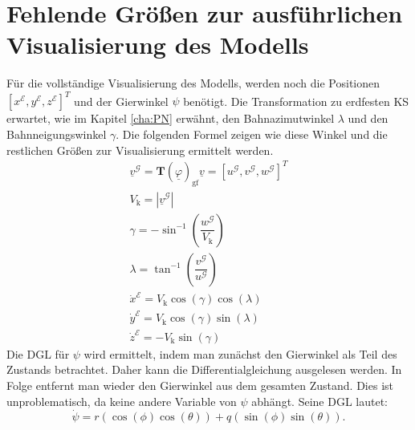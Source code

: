 \section{Fehlende Größen zur ausführlichen Visualisierung des Modells}
\label{sec:Visialisis}
Für die vollständige Visualisierung des Modells, werden noch die Positionen $[x^\mathcal{E},y^\mathcal{E},z^\mathcal{E}]^T$ und der Gierwinkel $\psi$ benötigt.  Die Transformation zu erdfesten KS erwartet, wie im Kapitel \ref{cha:PN} erwähnt, den Bahnazimutwinkel $\lambda$ und den Bahnneigungswinkel $\gamma$. Die folgenden Formel zeigen wie diese Winkel und die restlichen  Größen zur Visualisierung ermittelt werden.
\begin{align}
\underline{v}^\mathcal{G} = \textbf{T}(\underline{\varphi})_\mathrm{gf}\underline{v} = [u^\mathcal{G},v^\mathcal{G},w^\mathcal{G}]^T\\
V_\mathrm{k} = |\underline{v}^\mathcal{G}|\\
\gamma = -\sin^{-1}(\dfrac{w^\mathcal{G}}{V_\mathrm{k}})\\
\lambda = \tan^{-1}(\dfrac{v^\mathcal{G}}{u^\mathcal{G}})\\
\dot{x}^\mathcal{E} = V_\mathrm{k}\cos(\gamma)\cos(\lambda)\\
\dot{y}^\mathcal{E} = V_\mathrm{k}\cos(\gamma)\sin(\lambda)\\
\dot{z}^\mathcal{E} = -V_\mathrm{k}\sin(\gamma)
\end{align}
Die DGL für $\psi$ wird ermittelt, indem man zunächst den Gierwinkel als Teil des Zustands betrachtet. Daher kann die Differentialgleichung ausgelesen werden. In Folge entfernt man wieder den Gierwinkel aus dem gesamten Zustand. Dies ist unproblematisch, da keine andere Variable von $\psi$ abhängt. Seine DGL lautet:
\begin{equation}
\dot{\psi} = r(\cos(\phi)\cos(\theta)) + q(\sin(\phi)\sin(\theta)).
\end{equation}

